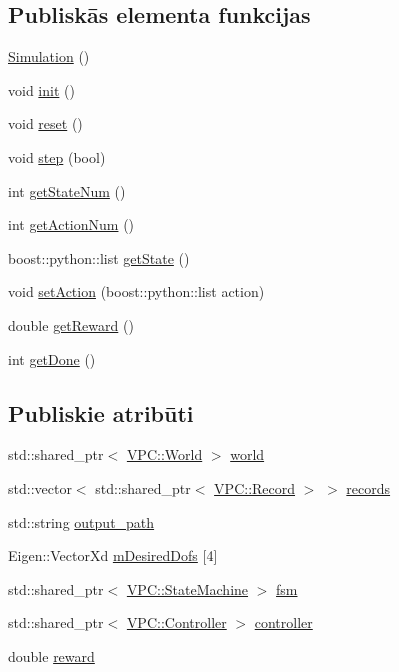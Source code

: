\subsection*{Publiskās elementa funkcijas}
\begin{DoxyCompactItemize}
\item 
\hyperlink{class_simulation_a5b224cc5b36bcc8eb29689aff223de41}{Simulation} ()
\item 
void \hyperlink{class_simulation_a10d9646039f5bffba768c3abd0b558c7}{init} ()
\item 
void \hyperlink{class_simulation_a2dc2464162d59383e0a1c68a3f9c42fb}{reset} ()
\item 
void \hyperlink{class_simulation_ae057193c8d120c47e136cdb9aeee2fd8}{step} (bool)
\item 
int \hyperlink{class_simulation_ad1124017cff783732cab02a78af0720d}{get\+State\+Num} ()
\item 
int \hyperlink{class_simulation_a75067c89a43d0e1798fc06c71c3e3a27}{get\+Action\+Num} ()
\item 
boost\+::python\+::list \hyperlink{class_simulation_a0fed4408760d2ba5c2e18aee56aa2f52}{get\+State} ()
\item 
void \hyperlink{class_simulation_ae024524b94a02df25c987e25cd83d8c9}{set\+Action} (boost\+::python\+::list action)
\item 
double \hyperlink{class_simulation_acdf5b1b5ec41703365499a888b0d6691}{get\+Reward} ()
\item 
int \hyperlink{class_simulation_ad5446c6b0bc0a889ffdd64d04454a2a2}{get\+Done} ()
\end{DoxyCompactItemize}
\subsection*{Publiskie atribūti}
\begin{DoxyCompactItemize}
\item 
std\+::shared\+\_\+ptr$<$ \hyperlink{class_v_p_c_1_1_world}{V\+P\+C\+::\+World} $>$ \hyperlink{class_simulation_ab8b3d4d3e13a05086f8497e5235fb37a}{world}
\item 
std\+::vector$<$ std\+::shared\+\_\+ptr$<$ \hyperlink{class_v_p_c_1_1_record}{V\+P\+C\+::\+Record} $>$ $>$ \hyperlink{class_simulation_a8e55698283d8bbba9843391b0d9ecfa8}{records}
\item 
std\+::string \hyperlink{class_simulation_a7c51cfbcfc8f08e47535a504dfbdd18a}{output\+\_\+path}
\item 
Eigen\+::\+Vector\+Xd \hyperlink{class_simulation_a3c630148d41a6eb21d13563e2017f7b6}{m\+Desired\+Dofs} \mbox{[}4\mbox{]}
\item 
std\+::shared\+\_\+ptr$<$ \hyperlink{class_v_p_c_1_1_state_machine}{V\+P\+C\+::\+State\+Machine} $>$ \hyperlink{class_simulation_a3a7d01e2a53a88044001a28aab387a97}{fsm}
\item 
std\+::shared\+\_\+ptr$<$ \hyperlink{class_v_p_c_1_1_controller}{V\+P\+C\+::\+Controller} $>$ \hyperlink{class_simulation_a2e3cc7be178e163d8a2bae06191993a7}{controller}
\item 
double \hyperlink{class_simulation_a5224aea8e98ffc054c58674ab1494971}{reward}
\end{DoxyCompactItemize}


